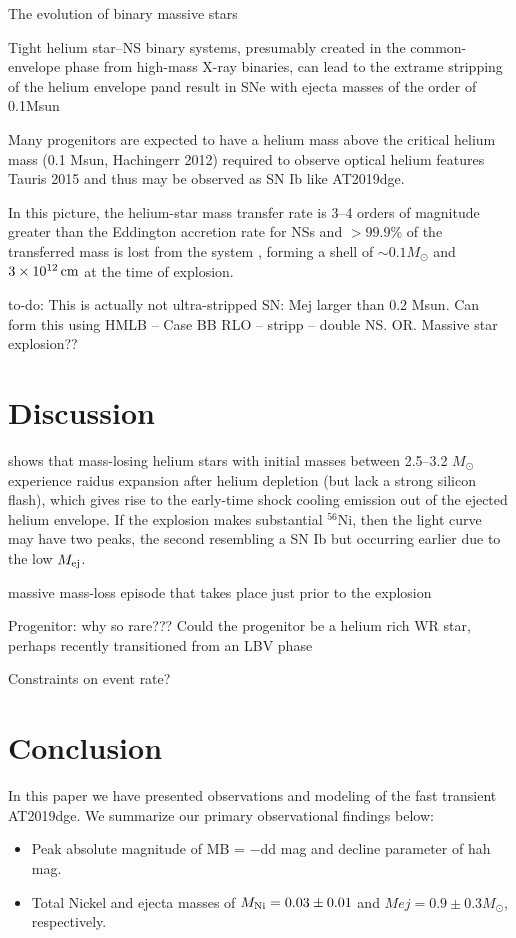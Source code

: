 \documentclass[twocolumn]{aastex63}
\newcommand{\todo}[1]{{\color{magenta} to-do: {#1}}}
\begin{document}
\begin{CJK*}{UTF8}{gbsn}
The evolution of binary massive stars

Tight helium star--NS binary systems, presumably created in the common-envelope phase from 
high-mass X-ray binaries, can lead to the extrame stripping of the helium envelope pand result in SNe 
with ejecta masses of the order of 0.1Msun 

Many progenitors are expected to have a helium mass above the critical helium mass (0.1 Msun, 
Hachingerr 2012) required to observe optical helium features Tauris 2015 and thus may be observed as 
SN Ib like AT2019dge.

In this picture, the helium-star mass transfer rate is 3--4 orders of magnitude greater than the 
Eddington accretion rate  for NSs and $>99.9$\% of the transferred mass is lost from the system 
\citep{Tauris2015}, forming a shell of $\sim 0.1 M_\odot$ and $3\times 10^{12}\,{\rm cm}$ at the time of 
explosion.

\todo{This is actually not ultra-stripped SN: Mej larger than 0.2 Msun. Can form this using HMLB -- 
Case BB RLO -- stripp -- double NS.  OR. Massive star explosion??}

\section{Discussion}

\citet{Woosley2019} shows that mass-losing helium stars with initial masses between 2.5--3.2 
$M_\odot$ experience raidus expansion after helium depletion (but lack a strong silicon flash), which 
gives rise to the early-time shock 
cooling emission out of the ejected helium envelope. If the explosion makes substantial $^{56}$Ni, then 
the light curve may have two peaks, the second resembling a SN Ib but occurring earlier due to the low 
$M_{\rm ej}$.


massive mass-loss episode that takes place just prior to the explosion \citep{Shiode2014}

Progenitor: why so rare???
Could the progenitor be a helium rich WR star, perhaps recently transitioned from an LBV phase 

Constraints on event rate?

\section{Conclusion}
In this paper we have presented observations and modeling of the fast transient AT2019dge. We 
summarize our primary observational findings below:
\begin{itemize}
	\item Peak absolute magnitude of MB = −dd mag and decline parameter of hah mag.
	\item  Total Nickel and ejecta masses of $M_{\rm Ni} = 0.03 \pm 0.01$ and $Mej = 0.9 \pm 0.3 
	M_\odot$, respectively.
\end{itemize}



\end{CJK*}
\end{document}
